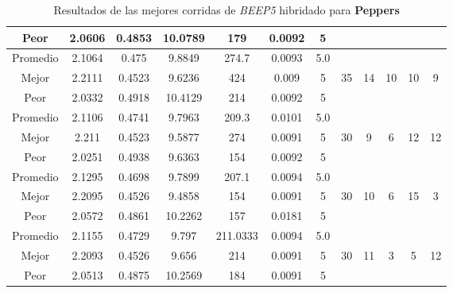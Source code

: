 \begin{table}[h!]
\begin{center}
\begin{tabular}{|c|c|c|c|c|c|c|c|c|c|c|c|}
            \cline{1-7}
            Peor & 2.0606 & 0.4853  & 10.0789 & 179 & 0.0092 & 5 &  &  &  &  & \\
        \hline
        \hline
            Promedio  & 2.1064 & 0.475 & 9.8849 & 274.7 & 0.0093 & 5.0 &  &  &  &  & \\
            \cline{1-7}
            Mejor & 2.2111 & 0.4523  & 9.6236 & 424 & 0.009 & 5 & 35 & 14 & 10 & 10 & 9\\
            \cline{1-7}
            Peor & 2.0332 & 0.4918  & 10.4129 & 214 & 0.0092 & 5 &  &  &  &  & \\
        \hline
        \hline
            Promedio  & 2.1106 & 0.4741 & 9.7963 & 209.3 & 0.0101 & 5.0 &  &  &  &  & \\
            \cline{1-7}
            Mejor & 2.211 & 0.4523  & 9.5877 & 274 & 0.0091 & 5 & 30 & 9 & 6 & 12 & 12\\
            \cline{1-7}
            Peor & 2.0251 & 0.4938  & 9.6363 & 154 & 0.0092 & 5 &  &  &  &  & \\
        \hline
        \hline
            Promedio  & 2.1295 & 0.4698 & 9.7899 & 207.1 & 0.0094 & 5.0 &  &  &  &  & \\
            \cline{1-7}
            Mejor & 2.2095 & 0.4526  & 9.4858 & 154 & 0.0091 & 5 & 30 & 10 & 6 & 15 & 3\\
            \cline{1-7}
            Peor & 2.0572 & 0.4861  & 10.2262 & 157 & 0.0181 & 5 &  &  &  &  & \\
        \hline
        \hline
            Promedio  & 2.1155 & 0.4729 & 9.797 & 211.0333 & 0.0094 & 5.0 &  &  &  &  & \\
            \cline{1-7}
            Mejor & 2.2093 & 0.4526  & 9.656 & 214 & 0.0091 & 5 & 30 & 11 & 3 & 5 & 12\\
            \cline{1-7}
            Peor & 2.0513 & 0.4875  & 10.2569 & 184 & 0.0091 & 5 &  &  &  &  & \\
        \hline
        \end{tabular}
        \caption{Resultados de las mejores corridas de \emph{BEEP5} hibridado para {\bf Peppers}}
        \label{tb:tableBEEP5}
    \end{center}
\end{table}
